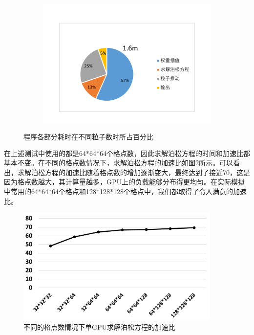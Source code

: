 \begin{figure}[!htb]
\begin{subfigure}[b]{0.75\textwidth}
        \includegraphics[width=\textwidth]{Img/PIC_speedup_1GPU_percentage3.pdf}
    \end{subfigure}
    \caption{程序各部分耗时在不同粒子数时所占百分比}\label{fig:PIC_speedup_1GPU_percentage}
\end{figure}

在上述测试中使用的都是64*64*64个格点数，因此求解泊松方程的时间和加速比都基本不变。在不同的格点数情况下，求解泊松方程的加速比如图\ref{fig:PIC_speedup_1GPU_Poisson}所示。可以看出，求解泊松方程的加速比随着格点数的增加逐渐变大，最终达到了接近70，这是因为格点数越大，其计算量越多，GPU上的负载能够分布得更均匀。在实际模拟中常用的64*64*64个格点和128*128*128个格点中，我们都取得了令人满意的加速比。

\begin{figure}[!htb]
  \centering
  \includegraphics[width=0.9\textwidth]{Img/PIC_speedup_1GPU_Poisson.pdf}
  \caption{不同的格点数情况下单GPU求解泊松方程的加速比}
  \label{fig:PIC_speedup_1GPU_Poisson}
\end{figure}


